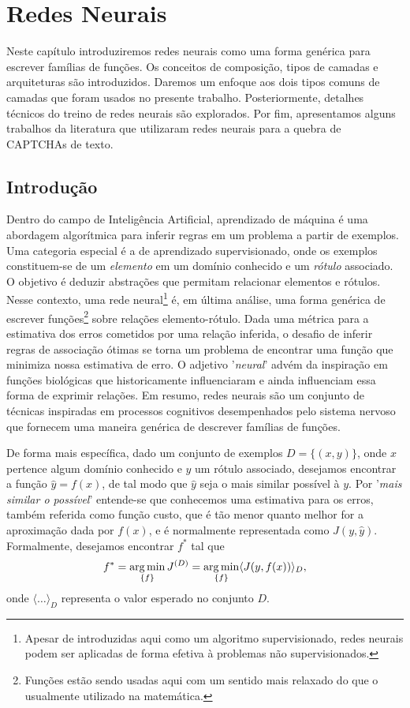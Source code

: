 \chapter{Redes Neurais} \label{cap:neurais}

Neste capítulo introduziremos redes neurais como uma forma genérica para escrever famílias de funções. Os conceitos de composição, tipos de camadas e arquiteturas são introduzidos. Daremos um enfoque aos dois tipos comuns de camadas que foram usados no presente trabalho. Posteriormente, detalhes técnicos do treino de redes neurais são explorados. Por fim, apresentamos alguns trabalhos da literatura que utilizaram redes neurais para a quebra de CAPTCHAs de texto.

\section{Introdução}

Dentro do campo de Inteligência Artificial, aprendizado de máquina é uma abordagem algorítmica para inferir regras em um problema a partir de exemplos. Uma categoria especial é a de aprendizado supervisionado, onde os exemplos constituem-se de um \textit{elemento} em um domínio conhecido e um \textit{rótulo} associado. O objetivo é deduzir abstrações que permitam relacionar elementos e rótulos. Nesse contexto, uma rede neural\footnote{Apesar de introduzidas aqui como um algoritmo supervisionado, redes neurais podem ser aplicadas de forma efetiva à problemas não supervisionados.} é, em última análise, uma forma genérica de escrever funções\footnote{Funções estão sendo usadas aqui com um sentido mais relaxado do que o usualmente utilizado na matemática.} sobre relações elemento-rótulo. Dada uma métrica para a estimativa dos erros cometidos por uma relação inferida, o desafio de inferir regras de associação ótimas se torna um problema de encontrar uma função que minimiza nossa estimativa de erro. O adjetivo '\textit{neural}' advém da inspiração em funções biológicas que historicamente influenciaram e ainda influenciam essa forma de exprimir relações. Em resumo, redes neurais são um conjunto de técnicas inspiradas em processos cognitivos desempenhados pelo sistema nervoso que fornecem uma maneira genérica de descrever famílias de funções.

De forma mais específica, dado um conjunto de exemplos $D = \{(x, y)\}$, onde $x$  pertence algum domínio conhecido e $y$ um rótulo associado, desejamos encontrar a função $\hat{y} = f(x)$, de tal modo que $\hat{y}$ seja o mais similar possível à $y$. Por '\textit{mais similar o possível}' entende-se que conhecemos uma estimativa para os erros, também referida como função custo, que é tão menor quanto melhor for a aproximação dada por $f(x)$, e é normalmente representada como $J(y, \hat{y})$. Formalmente, desejamos encontrar $f^*$ tal que
\begin{equation}
f^* = \operatorname*{arg\,min}_{\{f\}} J^{(D)} = \operatorname*{arg\,min}_{\{f\}} \langle J(y, f(x)) \rangle_{D},
\end{equation}   
onde $\langle \ldots \rangle_{D}$ representa o valor esperado no conjunto $D$.

